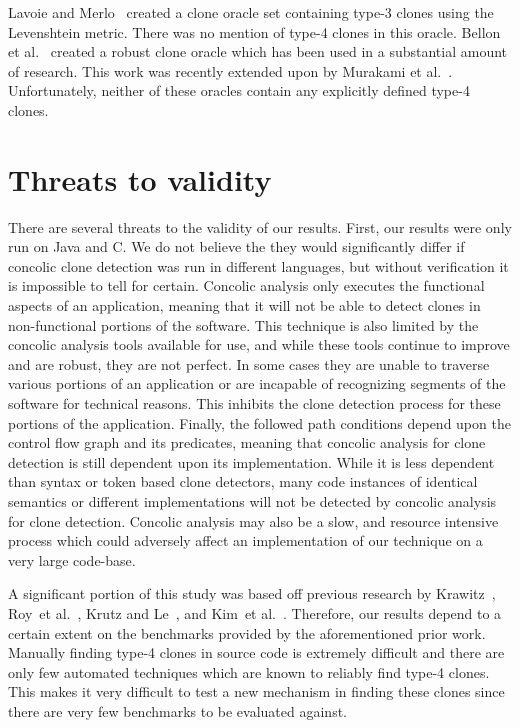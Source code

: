 \documentclass{sig-alternate}
\begin{document}
Lavoie and Merlo~\cite{Lavoie:2011:ATC:1985404.1985411} created a clone oracle set containing type-3 clones using the Levenshtein metric. There was no mention of type-4 clones in this oracle. Bellon et al.~\cite{4288192} created a robust clone oracle which has been used in a substantial amount of research. This work was recently extended upon by Murakami et al.~\cite{Murakami:2014:DCR:2597073.2597133}. Unfortunately, neither of these oracles contain any explicitly defined type-4 clones.


\section{Threats to validity}
\label{sec: threats}
There are several threats to the validity of our results. First, our results were only run on Java and C. We do not believe the they would significantly differ if concolic clone detection was run in different languages, but without verification it is impossible to tell for certain. Concolic analysis only executes the functional aspects of an application, meaning that it will not be able to detect clones in non-functional portions of the software. This technique is also limited by the concolic analysis tools available for use, and while these tools continue to improve and are robust, they are not perfect. In some cases they are unable to traverse various portions of an application or are incapable of recognizing segments of the software for technical reasons. This inhibits the clone detection process for these portions of the application. Finally, the followed path conditions depend upon the control flow graph and its predicates, meaning that concolic analysis for clone detection is still dependent upon its implementation. While it is less dependent than syntax or token based clone detectors, many code instances of identical semantics or different implementations will not be detected by concolic analysis for clone detection. Concolic analysis may also be a slow, and resource intensive process which could adversely affect an implementation of our technique on a very large code-base.

A significant portion of this study was based off previous research by Krawitz~\cite{Kraw2012}, Roy~et al.~\cite{Roy:2009:CEC:1530898.1531101}, Krutz and Le~\cite{Krutz:2014:CCO:2597073.2597127}, and Kim~et al.~\cite{Kim:2011:MMC:1985793.1985835}. Therefore, our results depend to a certain extent on the benchmarks provided by the aforementioned prior work. Manually finding type-4 clones in source code is extremely difficult and there are only few automated techniques which are known to reliably find type-4 clones. This makes it very difficult to test a new mechanism in finding these clones since there are very few benchmarks to be evaluated against.
\end{document}
